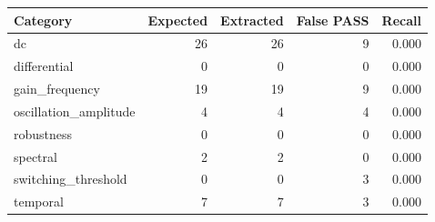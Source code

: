 \begin{tabular}{l r r r r}
\hline
Category & Expected & Extracted & False PASS & Recall \\
\hline
dc & 26 & 26 & 9 & 0.000 \\
differential & 0 & 0 & 0 & 0.000 \\
gain\_frequency & 19 & 19 & 9 & 0.000 \\
oscillation\_amplitude & 4 & 4 & 4 & 0.000 \\
robustness & 0 & 0 & 0 & 0.000 \\
spectral & 2 & 2 & 0 & 0.000 \\
switching\_threshold & 0 & 0 & 3 & 0.000 \\
temporal & 7 & 7 & 3 & 0.000 \\
\hline
\end{tabular}
